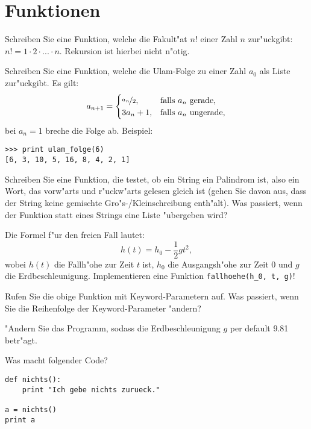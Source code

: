 \section*{Funktionen}
\begin{aufgabe}[Fakult"at]
\label{fakultaet}
Schreiben Sie eine Funktion, welche die Fakult"at $n!$ einer Zahl $n$ zur"uckgibt: $n! = 1 \cdot 2 \cdot ... \cdot n$. Rekursion ist hierbei nicht n"otig.
\end{aufgabe}

\begin{aufgabe}
\label{ulamfolge}
Schreiben Sie eine Funktion, welche die Ulam-Folge zu einer Zahl $a_0$ als Liste zur"uckgibt. Es gilt: 
\begin{displaymath}
a_{n+1} =
\begin{cases}
\nicefrac{a_n}{2}, & \text{falls } a_n \text{ gerade,}\\
3 a_n+1, & \text{falls } a_n \text{ ungerade,}\\
\end{cases}
\end{displaymath}
 bei $a_n=1$ breche die Folge ab. 
Beispiel: 
\begin{lstlisting}
>>> print ulam_folge(6)
[6, 3, 10, 5, 16, 8, 4, 2, 1]
\end{lstlisting}
\end{aufgabe}

\begin{aufgabe}[Palindrom]
\label{palindrom}
Schreiben Sie eine Funktion, die testet, ob ein String ein Palindrom ist, also ein Wort, das vorw"arts und r"uckw"arts gelesen gleich ist (gehen Sie davon aus, dass der String keine gemischte Gro"s-/Kleinschreibung enth"alt). Was passiert, wenn der Funktion statt eines Strings eine Liste "ubergeben wird? 
\end{aufgabe}

\begin{aufgabe}
\label{freier_fall}
Die Formel f"ur den freien Fall lautet: 
\begin{displaymath}
h(t) = h_0 - \frac{1}{2} gt^2, 
\end{displaymath}
wobei $h(t)$ die Fallh"ohe zur Zeit $t$ ist, $h_0$ die Ausgangsh"ohe zur Zeit 0 und $g$ die Erdbeschleunigung. Implementieren eine Funktion \lstinline{fallhoehe(h_0, t, g)}!
\begin{teilaufgabe}
Rufen Sie die obige Funktion mit Keyword-Parametern auf. Was passiert, wenn Sie die Reihenfolge der Keyword-Parameter "andern?
\end{teilaufgabe}
\begin{teilaufgabe}
"Andern Sie das Programm, sodass die Erdbeschleunigung $g$ per default 9.81 betr"agt.
\end{teilaufgabe}
\end{aufgabe}

\begin{aufgabe}
Was macht folgender Code?\\
\begin{lstlisting}
def nichts():
    print "Ich gebe nichts zurueck."

a = nichts()
print a
\end{lstlisting}
\end{aufgabe}


